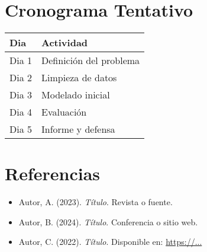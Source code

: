\documentclass[12pt,a4paper]{article}
\begin{document}
\section{Cronograma Tentativo}
\begin{tabular}{|p{4cm}|p{10cm}|}
\hline
\textbf{Dia} & \textbf{Actividad} \\
\hline
Dia 1 & Definición del problema \\
\hline
Dia 2 & Limpieza de datos \\
\hline
Dia 3 & Modelado inicial \\
\hline
Dia 4 & Evaluación \\
\hline
Dia 5 & Informe y defensa \\
\hline
\end{tabular}

\section{Referencias}
\begin{itemize}
    \item Autor, A. (2023). \textit{Título}. Revista o fuente.
    \item Autor, B. (2024). \textit{Título}. Conferencia o sitio web.
    \item Autor, C. (2022). \textit{Título}. Disponible en: \url{https://...}
\end{itemize}
\end{document}
